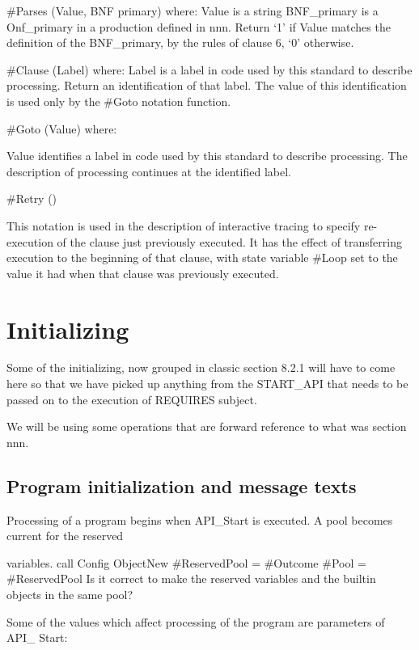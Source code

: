 \#Parses (Value, BNF primary) where: Value is a string BNF\_primary is a
Onf\_primary in a production defined in nnn. Return `1' if Value matches
the definition of the BNF\_primary, by the rules of clause 6, `0'
otherwise.

\#Clause (Label) where: Label is a label in code used by this standard
to describe processing. Return an identification of that label. The
value of this identification is used only by the \#Goto notation
function.

\#Goto (Value) where:

Value identifies a label in code used by this standard to describe
processing. The description of processing continues at the identified
label.

\#Retry ()

This notation is used in the description of interactive tracing to
specify re-execution of the clause just previously executed. It has the
effect of transferring execution to the beginning of that clause, with
state variable \#Loop set to the value it had when that clause was
previously executed.

\hypertarget{initializing}{%
\section{Initializing}\label{initializing}}

Some of the initializing, now grouped in classic section 8.2.1 will have
to come here so that we have picked up anything from the START\_API that
needs to be passed on to the execution of REQUIRES subject.

We will be using some operations that are forward reference to what was
section nnn.

\hypertarget{program-initialization-and-message-texts}{%
\subsection{Program initialization and message
texts}\label{program-initialization-and-message-texts}}

Processing of a program begins when API\_Start is executed. A pool
becomes current for the reserved

variables. call Config ObjectNew \#ReservedPool = \#Outcome \#Pool =
\#ReservedPool Is it correct to make the reserved variables and the
builtin objects in the same pool?

Some of the values which affect processing of the program are parameters
of API\_ Start:

